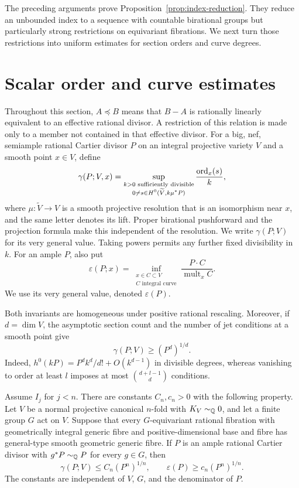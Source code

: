 The preceding arguments prove Proposition~\ref{prop:index-reduction}.
They reduce an unbounded index to a sequence with countable birational
groups but particularly strong restrictions on equivariant fibrations.
We next turn those restrictions into uniform estimates for section
orders and curve degrees.

\section{Scalar order and curve estimates}
\label{sec:scalar}

Throughout this section, $A\preceq B$ means that $B-A$ is rationally
linearly equivalent to an effective rational divisor.  A restriction
of this relation is made only to a member not contained in that
effective divisor.  For a big, nef, semiample rational Cartier divisor
$P$ on an integral projective variety $V$ and a smooth point $x\in V$,
define
\[
 \gamma(P;V,x)=\sup_{\substack{k>0\text{ sufficiently divisible}\\
                      0\ne s\in H^0(\widetilde V,k\mu^*P)}}
                        \frac{\operatorname{ord}_x(s)}{k},
\]
where $\mu:\widetilde V\to V$ is a smooth projective resolution
that is an isomorphism near $x$, and the same letter denotes its lift.
Proper birational pushforward and the projection formula make this
independent of the resolution.  We write $\gamma(P;V)$ for its very
general value.  Taking powers permits any further fixed divisibility
in $k$.  For an ample $P$, also put
\[
 \varepsilon(P;x)=\inf_{\substack{x\in C\subset V\\C\text{ integral curve}}}
                         \frac{P\cdot C}{\operatorname{mult}_x C}.
\]
We use its very general value, denoted $\varepsilon(P)$.

Both invariants are homogeneous under positive rational rescaling.
Moreover, if $d=\dim V$, the asymptotic section count and the number
of jet conditions at a smooth point give
\begin{equation}\label{eq:gamma-volume}
                              \gamma(P;V)\ge(P^d)^{1/d}.
\end{equation}
Indeed, $h^0(kP)=P^d k^d/d!+O(k^{d-1})$ in divisible degrees,
whereas vanishing to order at least $l$ imposes at most
$\binom{d+l-1}{d}$ conditions.

\begin{proposition}
\label{prop:scalar}
Assume $I_j$ for $j<n$.  There are constants $C_n,c_n>0$ with the
following property.  Let $V$ be a normal projective canonical
$n$-fold with $K_V\sim_{\mathbb Q}0$, and let a finite group $G$ act on
$V$.  Suppose that every $G$-equivariant rational fibration with
geometrically integral generic fibre and positive-dimensional base
and fibre has general-type smooth geometric generic fibre.  If $P$
is an ample rational Cartier divisor with $g^*P\sim_{\mathbb Q}P$ for
every $g\in G$, then
\begin{equation}\label{eq:scalar-estimates}
       \gamma(P;V)\le C_n(P^n)^{1/n},
       \qquad \varepsilon(P)\ge c_n(P^n)^{1/n}.
\end{equation}
The constants are independent of $V$, $G$, and the denominator of $P$.
\end{proposition}

